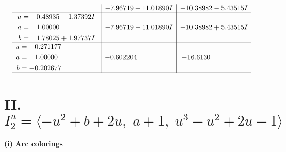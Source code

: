 \documentclass[1p]{elsarticle_modified}
\theoremstyle{definition}
\begin{document}
$$\begin{array}{c|c|c}
 & -7.96719 + 11.01890 I & -10.38982 - 5.43515 I \\ \hline\begin{aligned}
u &= -0.48935 - 1.37392 I \\
a &= \phantom{-}1.00000\phantom{ +0.000000I} \\
b &= \phantom{-}1.78025 + 1.97737 I\end{aligned}
 & -7.96719 - 11.01890 I & -10.38982 + 5.43515 I \\ \hline\begin{aligned}
u &= \phantom{-}0.271177\phantom{ +0.000000I} \\
a &= \phantom{-}1.00000\phantom{ +0.000000I} \\
b &= -0.202677\phantom{ +0.000000I}\end{aligned}
 & -0.602204\phantom{ +0.000000I} & -16.6130\phantom{ +0.000000I}\\
 \hline 
 \end{array}$$\newpage\newpage\renewcommand{\arraystretch}{1}
\centering \section*{II. $I^u_{2}= \langle - u^2+b+2 u,\;a+1,\;u^3- u^2+2 u-1 \rangle$}
\flushleft \textbf{(i) Arc colorings}\\
\end{document}
